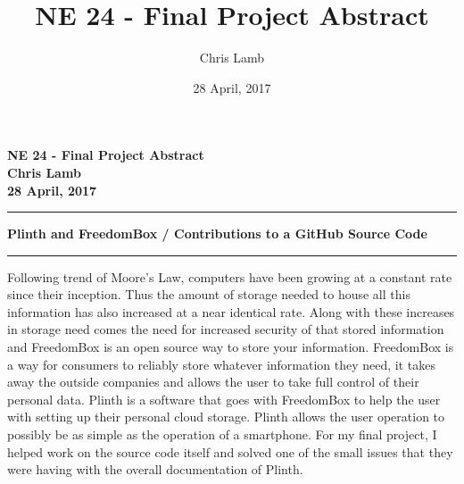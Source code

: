 \documentclass[12pt]{article}
\author{Chris Lamb}
\title{NE 24 - Final Project Abstract}
\date{28 April, 2017}
\begin{document}
\begin{center}
\textbf{NE 24 - Final Project Abstract \\ Chris Lamb \\ 28 April, 2017}
\end{center}
\noindent\rule{17cm}{1pt}

\begin{center}
\textbf{Plinth and FreedomBox / Contributions to a GitHub Source Code}
\rule{14cm}{0.4pt}
\end{center}

Following trend of Moore's Law, computers have been growing at a constant rate since their inception. Thus the amount of storage needed to house all this information has also increased at a near identical rate. Along with these increases in storage need comes the need for increased security of that stored information and FreedomBox is an open source way to store your information. FreedomBox is a way for consumers to reliably store whatever information they need, it takes away the outside companies and allows the user to take full control of their personal data. Plinth is a software that goes with FreedomBox to help the user with setting up their personal cloud storage. Plinth allows the user operation to possibly be as simple as the operation of a smartphone. For my final project, I helped work on the source code itself and solved one of the small issues that they were having with the overall documentation of Plinth. 
\end{document}
